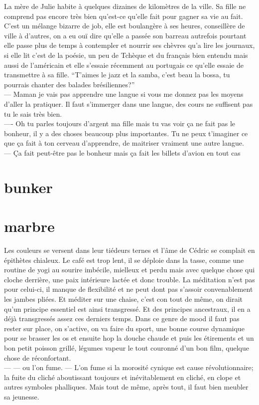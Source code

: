 \documentclass{article}
\begin{document}
La mère de Julie habite à quelques dizaines de kilomètres de la ville. Sa fille
ne comprend pas encore très bien qu’est-ce qu’elle fait pour gagner sa vie au
fait. C’est un mélange bizarre de job, elle est boulangère à ses heures,
conseillère de ville à d’autres, on a eu ouï dire qu’elle a passée son barreau
autrefois pourtant elle passe plus de temps à contempler et nourrir ses chèvres
qu’a lire les journaux, si elle lit c’est de la poésie, un peu de Tchèque et du
français bien entendu mais aussi de l’américain et elle s’essaie récemment au
portugais ce qu’elle essaie de transmettre à sa fille. “T’aimes le jazz et la
samba, c’est beau la bossa, tu pourrais chanter des balades brésiliennes?”\\
--- Maman je vais pas apprendre une langue si vous me donnez pas les moyens
d'aller la pratiquer. Il faut s'immerger dans une langue, des cours ne suffisent
pas tu le sais très bien.\\
---- Oh tu parles toujours d'argent ma fille mais tu vas voir ça ne fait pas le bonheur,
il y a des choses beaucoup plus importantes. Tu ne peux t'imaginer ce que ça fait à ton cerveau
d'apprendre, de maitriser vraiment une autre langue.\\
--- Ça fait peut-être pas le bonheur mais ça fait les billets d'avion en tout cas
\clearpage


\section{bunker}


\section{marbre}

Les couleurs se versent dans leur tiédeurs ternes et l'âme de Cédric se complait
en épithètes chialeux. Le café est trop lent, il se déploie dans la tasse, comme
une routine de yogi au sourire imbécile, mielleux et perdu mais avec quelque
chose qui cloche derrière, une paix intérieure lactée et donc trouble. La
méditation n'est pas pour celui-ci, il manque de flexibilité et ne peut dont pas
s'assoir convenablement les jambes pliées. Et méditer sur une chaise, c'est con
tout de même, on dirait qu'un principe essentiel est ainsi transgressé. Et des
principes ancestraux, il en a déjà transgressés assez ces derniers temps. Dans
ce genre de mood il faut pas rester sur place, on s'active, on va faire du
sport, une bonne course dynamique pour se brasser les os et ensuite hop la
douche chaude et puis les étirements et un bon petit poisson grillé, légumes
vapeur le tout couronné d'un bon film, quelque chose de réconfortant. \\--- ---
ou l'on fume. --- L'on fume si la morosité cynique est cause révolutionnaire; la
fuite du cliché aboutissant toujours et inévitablement en cliché, en clope et
autres symboles phalliques. Mais tout de même, après tout, il faut bien meubler
sa jeunesse. \\
\end{document}
